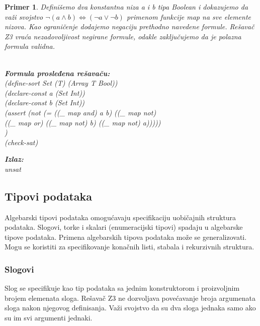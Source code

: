 \documentclass[12pt,oneside]{memoir}
\newcommand\tab[1][0.5cm]{\hspace*{#1}}
\newtheorem{primer}{Primer}
\begin{document}
\begin{primer} Definišemo dva konstantna niza a i b tipa Boolean i dokazujemo da važi svojstvo $\neg{(a \land b)} \Leftrightarrow (\neg{a} \lor \neg{b}) $ primenom funkcije map na sve elemente nizova. Kao ograničenje dodajemo negaciju prethodno navedene formule. Rešavač Z3 vraća nezadovoljivost negirane formule, odakle zaključujemo da je polazna formula validna.\\ \\
\begin{minipage}[b]{0.65\textwidth}
\textbf{Formula prosleđena rešavaču:}
\\(define-sort Set (T) (Array T Bool))
\\(declare-const a (Set Int))
\\(declare-const b (Set Int))
\\(assert (not (= ((\_ map and) a b) ((\_ map not) 
\\\tab((\_ map or) ((\_ map not) b) ((\_ map not) a)))))
\\)
\\(check-sat)
\end{minipage}
\hspace{2.5cm} 
\begin{minipage}[t]{0.5\textwidth}
\vspace{-4.65cm}
\textbf{Izlaz:}
\\unsat 
\end{minipage}
\end{primer}

\subsection{Tipovi podataka} 

Algebarski tipovi podataka omogućavaju specifikaciju uobičajnih struktura podataka. Slogovi, torke i skalari (enumeracijski tipovi) spadaju u algebarske tipove podataka. Primena algebarskih tipova podataka može se generalizovati. Mogu se koristiti za specifikovanje konačnih listi, stabala i rekurzivnih struktura. 
\subsubsection{Slogovi}
Slog se specifikuje kao tip podataka sa jednim konstruktorom i proizvoljnim brojem elemenata sloga. Rešavač Z3 ne dozvoljava povećavanje broja argumenata sloga nakon njegovog definisanja. Važi svojstvo da su dva sloga jednaka samo ako su im svi argumenti jednaki.
\end{document}
